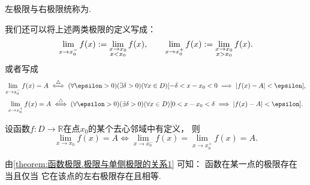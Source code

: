 左极限与右极限统称为.

\begin{remark}
我们还可以将上述两类极限的定义写成：\begin{gather*}
	\lim_{x \to x_0^-} f(x)
	:=
	\lim_{\substack{x \to x_0 \\ x < x_0}} f(x), \qquad
	\lim_{x \to x_0^+} f(x)
	:=
	\lim_{\substack{x \to x_0 \\ x > x_0}} f(x).
\end{gather*}
或者写成\begin{gather*}
	\lim_{x \to x_0^-} f(x) = A
	\defiff
	(\forall \epsilon > 0)
	(\exists \delta > 0)
	(\forall x \in D)
	[-\delta < x - x_0 < 0 \implies \abs{f(x) - A} < \epsilon], \\
	\lim_{x \to x_0^+} f(x) = A
	\defiff
	(\forall \epsilon > 0)
	(\exists \delta > 0)
	(\forall x \in D)
	[0 < x - x_0 < \delta \implies \abs{f(x) - A} < \epsilon].
\end{gather*}
\end{remark}

\begin{proposition}\label{theorem:函数极限.极限与单侧极限的关系1}
设函数\(f\colon D\to\mathbb{R}\)在点\(x_0\)的某个去心邻域中有定义，
则\begin{equation*}
	\lim_{x \to x_0} f(x) = A
	\iff
	\lim_{x \to x_0^-} f(x) = \lim_{x \to x_0^+} f(x) = A.
\end{equation*}
\end{proposition}
\begin{remark}
由\cref{theorem:函数极限.极限与单侧极限的关系1} 可知：
函数在某一点的极限存在
当且仅当
它在该点的左右极限存在且相等.
\end{remark}

